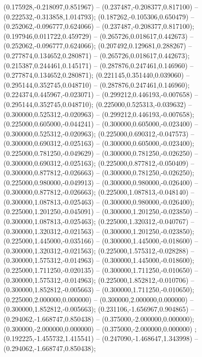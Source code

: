  (0.175928,-0.218097,0.851967) -- (0.237487,-0.208377,0.817100) -- (0.222532,-0.313858,1.014793);
 (0.187262,-0.105306,0.650479) -- (0.252062,-0.096777,0.624066) -- (0.237487,-0.208377,0.817100);
 (0.197946,0.011722,0.459729) -- (0.265726,0.018617,0.442673) -- (0.252062,-0.096777,0.624066);
 (0.207492,0.129681,0.288267) -- (0.277874,0.134652,0.280871) -- (0.265726,0.018617,0.442673);
 (0.215387,0.244461,0.145171) -- (0.287876,0.247461,0.146960) -- (0.277874,0.134652,0.280871);
 (0.221145,0.351440,0.039060) -- (0.295144,0.352745,0.048710) -- (0.287876,0.247461,0.146960);
 (0.224374,0.445967,-0.023071) -- (0.299212,0.446193,-0.007658) -- (0.295144,0.352745,0.048710);
 (0.225000,0.525313,-0.039632) -- (0.300000,0.525312,-0.020963) -- (0.299212,0.446193,-0.007658);
 (0.225000,0.605000,-0.044241) -- (0.300000,0.605000,-0.023400) -- (0.300000,0.525312,-0.020963);
 (0.225000,0.690312,-0.047573) -- (0.300000,0.690312,-0.025163) -- (0.300000,0.605000,-0.023400);
 (0.225000,0.781250,-0.049629) -- (0.300000,0.781250,-0.026250) -- (0.300000,0.690312,-0.025163);
 (0.225000,0.877812,-0.050409) -- (0.300000,0.877812,-0.026663) -- (0.300000,0.781250,-0.026250);
 (0.225000,0.980000,-0.049913) -- (0.300000,0.980000,-0.026400) -- (0.300000,0.877812,-0.026663);
 (0.225000,1.087813,-0.048140) -- (0.300000,1.087813,-0.025463) -- (0.300000,0.980000,-0.026400);
 (0.225000,1.201250,-0.045091) -- (0.300000,1.201250,-0.023850) -- (0.300000,1.087813,-0.025463);
 (0.225000,1.320312,-0.040767) -- (0.300000,1.320312,-0.021563) -- (0.300000,1.201250,-0.023850);
 (0.225000,1.445000,-0.035166) -- (0.300000,1.445000,-0.018600) -- (0.300000,1.320312,-0.021563);
 (0.225000,1.575312,-0.028288) -- (0.300000,1.575312,-0.014963) -- (0.300000,1.445000,-0.018600);
 (0.225000,1.711250,-0.020135) -- (0.300000,1.711250,-0.010650) -- (0.300000,1.575312,-0.014963);
 (0.225000,1.852812,-0.010706) -- (0.300000,1.852812,-0.005663) -- (0.300000,1.711250,-0.010650);
 (0.225000,2.000000,0.000000) -- (0.300000,2.000000,0.000000) -- (0.300000,1.852812,-0.005663);
 (0.231106,-1.656967,0.904865) -- (0.294062,-1.668747,0.850438) -- (0.375000,-2.000000,0.000000);
 (0.300000,-2.000000,0.000000) -- (0.375000,-2.000000,0.000000) ;
 (0.192225,-1.455732,1.415541) -- (0.247090,-1.468647,1.343998) -- (0.294062,-1.668747,0.850438);
